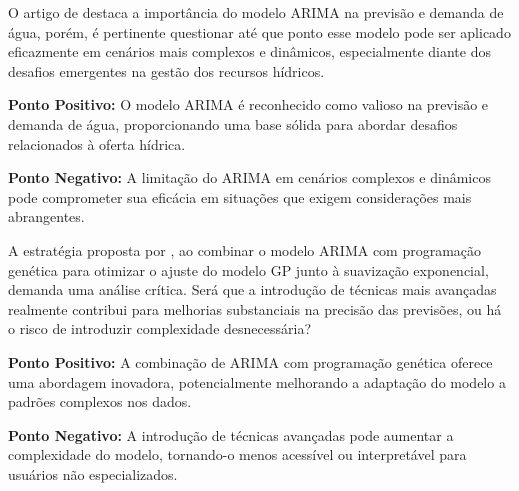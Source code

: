 %
%
%

O artigo de  destaca a importância do modelo ARIMA na previsão e demanda de água, porém, é pertinente questionar até que ponto esse modelo pode ser aplicado eficazmente em cenários mais complexos e dinâmicos, especialmente diante dos desafios emergentes na gestão dos recursos hídricos.

\textbf{Ponto Positivo:} O modelo ARIMA é reconhecido como valioso na previsão e demanda de água, proporcionando uma base sólida para abordar desafios relacionados à oferta hídrica.

\textbf{Ponto Negativo:} A limitação do ARIMA em cenários complexos e dinâmicos pode comprometer sua eficácia em situações que exigem considerações mais abrangentes.

A estratégia proposta por , ao combinar o modelo ARIMA com programação genética para otimizar o ajuste do modelo GP junto à suavização exponencial, demanda uma análise crítica. Será que a introdução de técnicas mais avançadas realmente contribui para melhorias substanciais na precisão das previsões, ou há o risco de introduzir complexidade desnecessária?

\textbf{Ponto Positivo:} A combinação de ARIMA com programação genética oferece uma abordagem inovadora, potencialmente melhorando a adaptação do modelo a padrões complexos nos dados.

\textbf{Ponto Negativo:} A introdução de técnicas avançadas pode aumentar a complexidade do modelo, tornando-o menos acessível ou interpretável para usuários não especializados.

